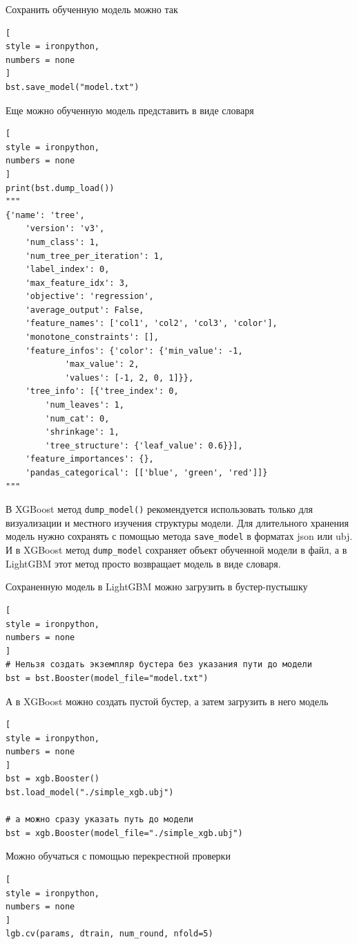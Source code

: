 \documentclass[%
	11pt,
	a4paper,
	utf8,
		]{article}
\begin{document}
Сохранить обученную модель можно так
\begin{lstlisting}[
style = ironpython,
numbers = none
]
bst.save_model("model.txt")
\end{lstlisting}

Еще можно обученную модель представить в виде словаря 
\begin{lstlisting}[
style = ironpython,
numbers = none
]
print(bst.dump_load())
"""
{'name': 'tree',
	'version': 'v3',
	'num_class': 1,
	'num_tree_per_iteration': 1,
	'label_index': 0,
	'max_feature_idx': 3,
	'objective': 'regression',
	'average_output': False,
	'feature_names': ['col1', 'col2', 'col3', 'color'],
	'monotone_constraints': [],
	'feature_infos': {'color': {'min_value': -1,
			'max_value': 2,
			'values': [-1, 2, 0, 1]}},
	'tree_info': [{'tree_index': 0,
		'num_leaves': 1,
		'num_cat': 0,
		'shrinkage': 1,
		'tree_structure': {'leaf_value': 0.6}}],
	'feature_importances': {},
	'pandas_categorical': [['blue', 'green', 'red']]}
"""
\end{lstlisting}

В XGBoost метод \verb|dump_model()| рекомендуется использовать только для визуализации и местного изучения структуры модели. Для длительного хранения модель нужно сохранять с помощью метода \verb|save_model| в форматах json или ubj. И в XGBoost метод \verb|dump_model| сохраняет объект обученной модели в файл, а в LightGBM этот метод просто возвращает модель в виде словаря.

Сохраненную модель в LightGBM можно загрузить в бустер-пустышку
\begin{lstlisting}[
style = ironpython,
numbers = none
]
# Нельзя создать экземпляр бустера без указания пути до модели
bst = bst.Booster(model_file="model.txt")
\end{lstlisting}

А в XGBoost можно создать пустой бустер, а затем загрузить в него модель
\begin{lstlisting}[
style = ironpython,
numbers = none
]
bst = xgb.Booster()
bst.load_model("./simple_xgb.ubj")

# а можно сразу указать путь до модели
bst = xgb.Booster(model_file="./simple_xgb.ubj")
\end{lstlisting}

Можно обучаться с помощью перекрестной проверки
\begin{lstlisting}[
style = ironpython,
numbers = none
]
lgb.cv(params, dtrain, num_round, nfold=5)
\end{lstlisting}
\end{document}
